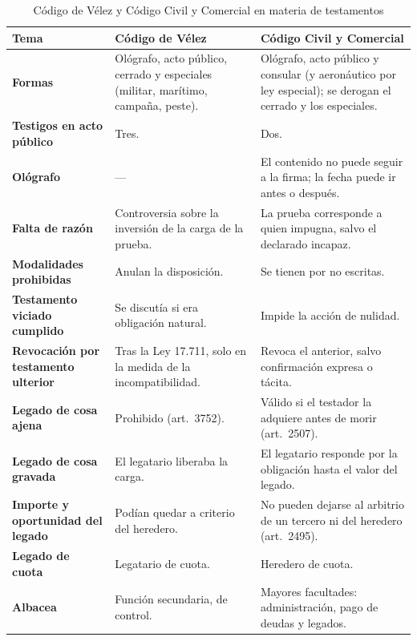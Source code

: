 \documentclass[12pt,oneside]{book}
\begin{document}
\begin{table}[H]
\centering
\caption{Código de Vélez y Código Civil y Comercial en materia de testamentos}
\footnotesize
\begin{tabularx}{\textwidth}{@{}>{\raggedright\arraybackslash}p{2.7cm}>{\raggedright\arraybackslash}X>{\raggedright\arraybackslash}X@{}}
\toprule
\textbf{Tema} & \textbf{Código de Vélez} & \textbf{Código Civil y Comercial} \\
\midrule
\textbf{Formas} & Ológrafo, acto público, cerrado y especiales (militar, marítimo, campaña, peste). & Ológrafo, acto público y consular (y aeronáutico por ley especial); se derogan el cerrado y los especiales. \\
\textbf{Testigos en acto público} & Tres. & Dos. \\
\textbf{Ológrafo} & --- & El contenido no puede seguir a la firma; la fecha puede ir antes o después. \\
\textbf{Falta de razón} & Controversia sobre la inversión de la carga de la prueba. & La prueba corresponde a quien impugna, salvo el declarado incapaz. \\
\textbf{Modalidades prohibidas} & Anulan la disposición. & Se tienen por no escritas. \\
\textbf{Testamento viciado cumplido} & Se discutía si era obligación natural. & Impide la acción de nulidad. \\
\textbf{Revocación por testamento ulterior} & Tras la Ley 17.711, solo en la medida de la incompatibilidad. & Revoca el anterior, salvo confirmación expresa o tácita. \\
\textbf{Legado de cosa ajena} & Prohibido (art.~3752). & Válido si el testador la adquiere antes de morir (art.~2507). \\
\textbf{Legado de cosa gravada} & El legatario liberaba la carga. & El legatario responde por la obligación hasta el valor del legado. \\
\textbf{Importe y oportunidad del legado} & Podían quedar a criterio del heredero. & No pueden dejarse al arbitrio de un tercero ni del heredero (art.~2495). \\
\textbf{Legado de cuota} & Legatario de cuota. & Heredero de cuota. \\
\textbf{Albacea} & Función secundaria, de control. & Mayores facultades: administración, pago de deudas y legados. \\
\bottomrule
\end{tabularx}
\end{table}
\end{document}
